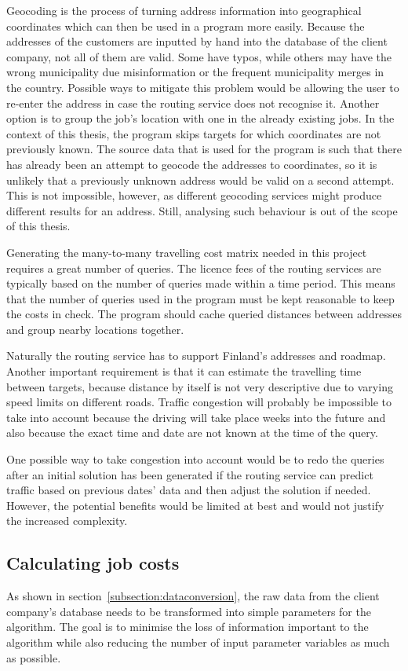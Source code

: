 Geocoding is the process of turning address information into geographical coordinates which can then be used in a program more easily. Because the addresses of the customers are inputted by hand into the database of the client company, not all of them are valid. Some have typos, while others may have the wrong municipality due misinformation or the frequent municipality merges in the country. Possible ways to mitigate this problem would be allowing the user to re-enter the address in case the routing service does not recognise it. Another option is to group the job's location with one in the already existing jobs. In the context of this thesis, the program skips targets for which coordinates are not previously known. The source data that is used for the program is such that there has already been an attempt to geocode the addresses to coordinates, so it is unlikely that a previously unknown address would be valid on a second attempt. This is not impossible, however, as different geocoding services might produce different results for an address. Still, analysing such behaviour is out of the scope of this thesis. 

Generating the many-to-many travelling cost matrix needed in this project requires a great number of queries. The licence fees of the routing services are typically based on the number of queries made within a time period. This means that the number of queries used in the program must be kept reasonable to keep the costs in check. The program should cache queried distances between addresses and group nearby locations together. 

Naturally the routing service has to support Finland's addresses and roadmap. Another important requirement is that it can estimate the travelling time between targets, because distance by itself is not very descriptive due to varying speed limits on different roads. Traffic congestion will probably be impossible to take into account because the driving will take place weeks into the future and also because the exact time and date are not known at the time of the query. 

One possible way to take congestion into account would be to redo the queries after an initial solution has been generated if the routing service can predict traffic based on previous dates' data and then adjust the solution if needed. However, the potential benefits would be limited at best and would not justify the increased complexity.


\subsection{Calculating job costs}
As shown in section~\ref{subsection:dataconversion}, the raw data from the client company's database needs to be transformed into simple parameters for the algorithm. The goal is to minimise the loss of information important to the algorithm while also reducing the number of input parameter variables as much as possible.  

